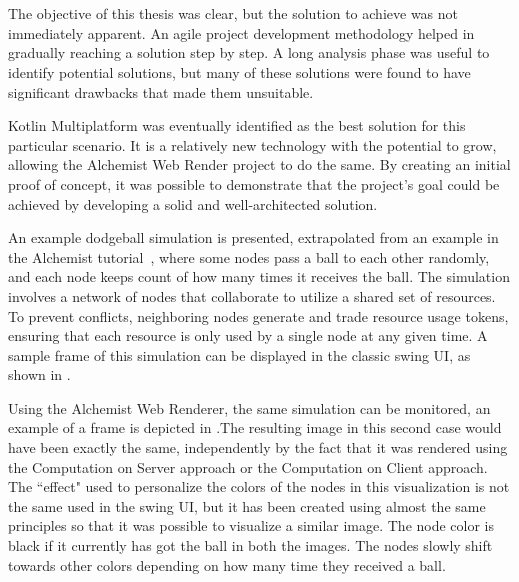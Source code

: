 \chapter{\conclusionsname}
\label{chap:conclusions}
The objective of this thesis was clear, but the solution to achieve was not immediately apparent. An agile project development methodology helped in gradually reaching a solution step by step. A long analysis phase was useful to identify potential solutions, but many of these solutions were found to have significant drawbacks that made them unsuitable.\newline


Kotlin Multiplatform was eventually identified as the best solution for this particular scenario. It is a relatively new technology with the potential to grow, allowing the Alchemist Web Render project to do the same. By creating an initial proof of concept, it was possible to demonstrate that the project's goal could be achieved by developing a solid and well-architected solution.\newline

An example dodgeball simulation is presented, extrapolated from an example in the
Alchemist tutorial~\cite{Coordination2021-alchemist-tutorial}, where some nodes pass a ball to each other randomly, and each node keeps count of how many times it receives the ball. The simulation involves a network of nodes that collaborate to utilize a shared set of resources. To prevent conflicts, neighboring nodes generate and trade resource usage tokens, ensuring that each resource is only used by a single node at any given time. A sample frame of this simulation can be displayed in the classic swing UI, as shown in .\newline


Using the Alchemist Web Renderer, the same simulation can be monitored, an example of a frame is depicted in .The resulting image in this second case would have been exactly the same, independently by the fact that it was rendered using the Computation on Server approach or the Computation on Client approach. The ``effect" used to personalize the colors of the nodes in this visualization is not the same used in the swing UI, but it has been created using almost the same principles so that it was possible to visualize a similar image. The node color is black if it currently has got the ball in both the images. The nodes slowly shift towards other colors depending on how many time they received a ball.\newline

